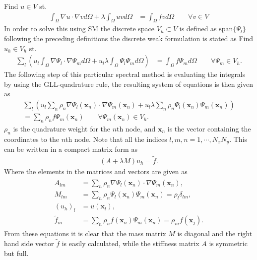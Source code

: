 Find $u\in V$ st. 
%
\begin{align}
    \int_{\Omega}\nabla u \cdot \nabla v d \Omega + \lambda \int_{\Omega} u vd \Omega 
    &= \int_{\Omega}f vd \Omega \qquad \forall v \in V
    \label{eq:Helmholtzweak}
\end{align}
%
In order to solve this using SM the discrete space $V_h \subset V$ is defined as $\text{span}\{\Psi_l\}$ following the preceding definitions 
the discrete weak formulation is stated as 
Find $u_h\in V_h$ st. 
%
\begin{align}
    \sum_l\left(  u_l\int_{\Omega}\nabla \Psi_l \cdot \nabla \Psi_m d \Omega + u_l\lambda \int_{\Omega} \Psi_l \Psi_md \Omega \right)
    &= \int_{\Omega}f \Psi_md \Omega \qquad \forall \Psi_m \in V_h.
    \label{eq:Helmholtzdiscrete}
\end{align}
%
The following step of this particular spectral method is evaluating the integrals by using the GLL-quadrature rule, the resulting system of equations 
is then given as 
%
\begin{align}
    \sum_l\left(  u_l\sum_n \rho_n\nabla \Psi_l(\mathbf{x}_{n}) \cdot \nabla \Psi_m(\mathbf{x}_{n}) + u_l\lambda \sum_n \rho_n \Psi_l(\mathbf{x}_{n}) \Psi_m(\mathbf{x}_{n})\right)\\
     = \sum_n \rho_nf \Psi_m(\mathbf{x}_{n})\qquad \forall \Psi_m(\mathbf{x}_{n}) \in V_h.
    \label{eq:Helmholtzquad}
\end{align}
%
$\rho_n$ is the quadrature weight for the $n$th node, and $\mathbf{x}_n$ is the vector containing the coordinates to the $n$th node.
Note that all the indices $l,m,n=1,\cdots,N_xN_y$.
This can be written in a compact matrix form as 
\begin{align}
    (A+\lambda M)u_h = \tilde f.
    \label{eq:Helmholtzmat}
\end{align}
Where the elements in the matrices and vectors are given as 
\begin{align}
    \begin{split}
        A_{lm} &= \sum_n \rho_n\nabla \Psi_l(\mathbf{x}_{n}) \cdot \nabla \Psi_m(\mathbf{x}_{n}),\\
        M_{lm} &= \sum_n \rho_n \Psi_l(\mathbf{x}_{n}) \Psi_m(\mathbf{x}_{n}) = \rho_l\delta_{lm},\\
        (u_h)_l & = u(\mathbf{x}_l), \\
        \tilde f_m &= \sum_n \rho_n f(\mathbf{x}_{n}) \Psi_m(\mathbf{x}_{n}) = \rho_m f(\mathbf{x}_{j}).
    \end{split}
    \label{eq:Helmholtzmatelem}
\end{align}
From these equations it is clear that the mass matrix $M$ is diagonal and the right hand side vector $\tilde f$ is easily calculated, 
while the stiffness matrix $A$ is symmetric but full.


